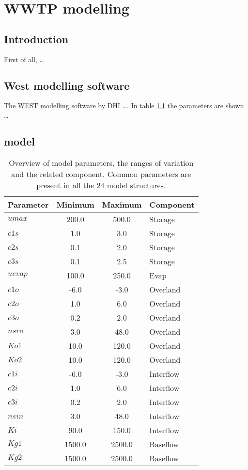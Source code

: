 \chapter[WWTP modelling]%
{WWTP modelling}

\section{Introduction}
First of all, \ldots

\section{West modelling software}
The WEST modelling software by DHI \ldots. In table \ref{partabel} the 
parameters are shown \ldots


\section{model}

\begin{table}
\caption{Overview of model parameters, the ranges of variation and the related component. Common parameters are present in all the 24 model structures. }
\centering
\begin{tabular}{l c c l}
\toprule
 Parameter  & Minimum & Maximum  & Component\\
 \midrule
$umax$ & 200.0  & 500.0  & Storage \\
$c1s$ & 1.0  & 3.0  & Storage   \\
$c2s$ & 0.1  & 2.0  & Storage  \\
$c3s$ & 0.1  & 2.5  & Storage  \\
$uevap$ & 100.0  & 250.0  & Evap \\
$c1o$ & -6.0  & -3.0  & Overland \\
$c2o$ & 1.0  & 6.0  & Overland  \\
$c3o$ & 0.2  & 2.0  & Overland \\
$nsro$ & 3.0  & 48.0  & Overland \\
$Ko1$ & 10.0  & 120.0  & Overland   \\
$Ko2$ & 10.0  & 120.0  & Overland  \\
$c1i$ & -6.0  & -3.0  & Interflow  \\
$c2i$ & 1.0  & 6.0 & Interflow \\
$c3i$ & 0.2  & 2.0  & Interflow \\
$nsin$ & 3.0  & 48.0  & Interflow  \\
$Ki$ &  90.0  & 150.0  & Interflow \\
$Kg1$ &   1500.0  & 2500.0  & Baseflow  \\
$Kg2$& 1500.0  & 2500.0  & Baseflow    \\
\bottomrule  
\end{tabular}
\label{partabel}
\end{table}


